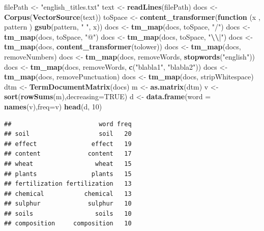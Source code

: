\documentclass[
  12pt,
]{article}
\newenvironment{Shaded}{\begin{snugshade}}{\end{snugshade}}
\newcommand{\AttributeTok}[1]{\textcolor[rgb]{0.13,0.29,0.53}{#1}}
\newcommand{\ConstantTok}[1]{\textcolor[rgb]{0.56,0.35,0.01}{#1}}
\newcommand{\ControlFlowTok}[1]{\textcolor[rgb]{0.13,0.29,0.53}{\textbf{#1}}}
\newcommand{\DecValTok}[1]{\textcolor[rgb]{0.00,0.00,0.81}{#1}}
\newcommand{\FunctionTok}[1]{\textcolor[rgb]{0.13,0.29,0.53}{\textbf{#1}}}
\newcommand{\NormalTok}[1]{#1}
\newcommand{\OtherTok}[1]{\textcolor[rgb]{0.56,0.35,0.01}{#1}}
\newcommand{\SpecialCharTok}[1]{\textcolor[rgb]{0.81,0.36,0.00}{\textbf{#1}}}
\newcommand{\StringTok}[1]{\textcolor[rgb]{0.31,0.60,0.02}{#1}}
\begin{document}
\begin{Shaded}
\begin{Highlighting}[]
\NormalTok{filePath }\OtherTok{\textless{}{-}} \StringTok{"english\_titles.txt"}
\NormalTok{text }\OtherTok{\textless{}{-}} \FunctionTok{readLines}\NormalTok{(filePath)}
\NormalTok{docs }\OtherTok{\textless{}{-}} \FunctionTok{Corpus}\NormalTok{(}\FunctionTok{VectorSource}\NormalTok{(text))}
\NormalTok{toSpace }\OtherTok{\textless{}{-}} \FunctionTok{content\_transformer}\NormalTok{(}\ControlFlowTok{function}\NormalTok{ (x , pattern ) }\FunctionTok{gsub}\NormalTok{(pattern, }\StringTok{" "}\NormalTok{, x))}
\NormalTok{docs }\OtherTok{\textless{}{-}} \FunctionTok{tm\_map}\NormalTok{(docs, toSpace, }\StringTok{"/"}\NormalTok{)}
\NormalTok{docs }\OtherTok{\textless{}{-}} \FunctionTok{tm\_map}\NormalTok{(docs, toSpace, }\StringTok{"@"}\NormalTok{)}
\NormalTok{docs }\OtherTok{\textless{}{-}} \FunctionTok{tm\_map}\NormalTok{(docs, toSpace, }\StringTok{"}\SpecialCharTok{\textbackslash{}\textbackslash{}}\StringTok{|"}\NormalTok{)}
\NormalTok{docs }\OtherTok{\textless{}{-}} \FunctionTok{tm\_map}\NormalTok{(docs, }\FunctionTok{content\_transformer}\NormalTok{(tolower))}
\NormalTok{docs }\OtherTok{\textless{}{-}} \FunctionTok{tm\_map}\NormalTok{(docs, removeNumbers)}
\NormalTok{docs }\OtherTok{\textless{}{-}} \FunctionTok{tm\_map}\NormalTok{(docs, removeWords, }\FunctionTok{stopwords}\NormalTok{(}\StringTok{"english"}\NormalTok{))}
\NormalTok{docs }\OtherTok{\textless{}{-}} \FunctionTok{tm\_map}\NormalTok{(docs, removeWords, }\FunctionTok{c}\NormalTok{(}\StringTok{"blabla1"}\NormalTok{, }\StringTok{"blabla2"}\NormalTok{)) }
\NormalTok{docs }\OtherTok{\textless{}{-}} \FunctionTok{tm\_map}\NormalTok{(docs, removePunctuation)}
\NormalTok{docs }\OtherTok{\textless{}{-}} \FunctionTok{tm\_map}\NormalTok{(docs, stripWhitespace)}
\NormalTok{dtm }\OtherTok{\textless{}{-}} \FunctionTok{TermDocumentMatrix}\NormalTok{(docs)}
\NormalTok{m }\OtherTok{\textless{}{-}} \FunctionTok{as.matrix}\NormalTok{(dtm)}
\NormalTok{v }\OtherTok{\textless{}{-}} \FunctionTok{sort}\NormalTok{(}\FunctionTok{rowSums}\NormalTok{(m),}\AttributeTok{decreasing=}\ConstantTok{TRUE}\NormalTok{)}
\NormalTok{d }\OtherTok{\textless{}{-}} \FunctionTok{data.frame}\NormalTok{(}\AttributeTok{word =} \FunctionTok{names}\NormalTok{(v),}\AttributeTok{freq=}\NormalTok{v)}
\FunctionTok{head}\NormalTok{(d, }\DecValTok{10}\NormalTok{)}
\end{Highlighting}
\end{Shaded}

\begin{verbatim}
##                        word freq
## soil                   soil   20
## effect               effect   19
## content             content   17
## wheat                 wheat   15
## plants               plants   15
## fertilization fertilization   13
## chemical           chemical   13
## sulphur             sulphur   10
## soils                 soils   10
## composition     composition   10
\end{verbatim}
\end{document}

